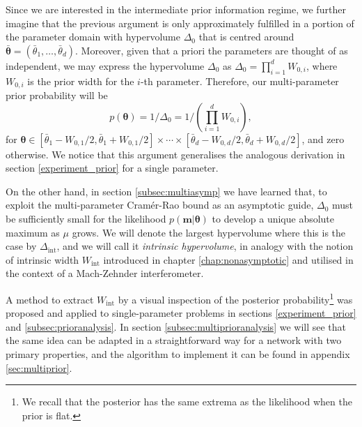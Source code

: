 Since we are interested in the intermediate prior information regime, we further imagine that the previous argument is only approximately fulfilled in a portion of the parameter domain with hypervolume $\Delta_0$ that is centred around $\boldsymbol{\bar{\theta}}=(\bar{\theta}_1, \dots, \bar{\theta}_d)$. Moreover, given that a priori the parameters are thought of as independent, we may express the hypervolume $\Delta_0$ as $\Delta_0 = \prod_{i=1}^d W_{0,i}$, where $W_{0,i}$ is the prior width for the $i$-th parameter. Therefore, our multi-parameter prior probability will be
\begin{equation}
p(\boldsymbol{\theta})=1/\Delta_0 = 1/\left(\prod_{i=1}^d W_{0,i}\right), 
\label{multiprior}
\end{equation}
for $\boldsymbol{\theta}\in [\bar{\theta}_1 - W_{0, 1}/2, \bar{\theta}_1 + W_{0, 1}/2]\times \cdots \times [\bar{\theta}_d - W_{0, d}/2, \bar{\theta}_d + W_{0,d}/2]$, and zero otherwise. We notice that this argument generalises the analogous derivation in section \ref{experiment_prior} for a single parameter. 

On the other hand, in section \ref{subsec:multiasymp} we have learned that, to exploit the multi-parameter Cram\'{e}r-Rao bound as an asymptotic guide, $\Delta_0$ must be sufficiently small for the likelihood $p(\boldsymbol{m}|\boldsymbol{\theta})$ to develop a unique absolute maximum as $\mu$ grows. We will denote the largest hypervolume where this is the case by $\Delta_{\mathrm{int}}$, and we will call it \emph{intrinsic hypervolume}, in analogy with the notion of intrinsic width $W_{\mathrm{int}}$ introduced in chapter \ref{chap:nonasymptotic} and utilised in the context of a Mach-Zehnder interferometer.

A method to extract $W_{\mathrm{int}}$ by a visual inspection of the posterior probability\footnote{We recall that the posterior has the same extrema as the likelihood when the prior is flat.} was proposed and applied to single-parameter problems in sections \ref{experiment_prior} and \ref{subsec:prioranalysis}. In section \ref{subsec:multiprioranalysis} we will see that the same idea can be adapted in a straightforward way for a network with two primary properties, and the algorithm to implement it can be found in appendix \ref{sec:multiprior}. 

